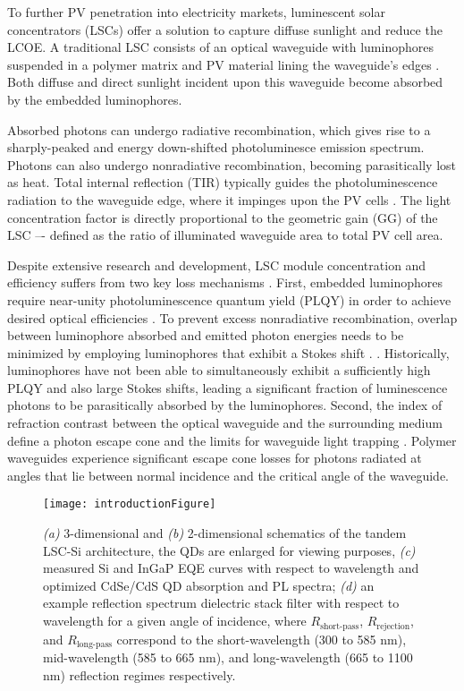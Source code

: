 \documentclass[conference]{./pvsctran}
\begin{document}
		To further PV penetration into electricity markets, luminescent solar concentrators (LSCs) offer a solution to capture diffuse sunlight and reduce the LCOE. A traditional LSC consists of an optical waveguide with luminophores suspended in a polymer matrix and PV material lining the waveguide’s edges \cite{Batchelder1982, Madrid2006, Meinardi2017}. Both diffuse and direct sunlight incident upon this waveguide become absorbed by the embedded luminophores. 
		
		Absorbed photons can undergo radiative recombination, which gives rise to a sharply-peaked and energy down-shifted photoluminesce emission spectrum.  Photons can also undergo nonradiative recombination, becoming parasitically lost as heat. Total internal reflection (TIR) typically guides the photoluminescence radiation to the waveguide edge, where it impinges upon the PV cells \cite{Goetzberger1977, Yablonovitch1980, Yablonovitch1982}. The light concentration factor is directly proportional to the geometric gain (GG) of the LSC –- defined as the ratio of illuminated waveguide area to total PV cell area. 
		
		Despite extensive research and development, LSC module concentration and efficiency suffers from two key loss mechanisms \cite{Gutmann2013, Sark2014}.  First, embedded luminophores require near-unity photoluminescence quantum yield (PLQY) in order to achieve desired optical efficiencies \cite{Martinez2016}.  To prevent excess nonradiative recombination, overlap between luminophore absorbed and emitted photon energies needs to be minimized by employing luminophores that exhibit a Stokes shift \cite{Bronstein2015, Hu2015}.  . Historically, luminophores have not been able to simultaneously exhibit a sufficiently high PLQY and also large Stokes shifts, leading a significant fraction of luminescence photons to be parasitically absorbed by the luminophores. Second, the index of refraction contrast between the optical waveguide and the surrounding medium define a photon escape cone and the limits for waveguide light trapping \cite{Goldschmidt2009}.  Polymer waveguides experience significant escape cone losses for photons radiated at angles that lie between normal incidence and the critical angle of the waveguide. 
		
		\begin{figure*}[t]
			\centering
			\texttt{[image: introductionFigure]}
			\caption{\textit{(a)} 3-dimensional and \textit{(b)} 2-dimensional schematics of the tandem LSC-Si architecture, the QDs are enlarged for viewing purposes, \textit{(c)} measured Si and InGaP EQE curves with respect to wavelength and optimized CdSe/CdS QD absorption and PL spectra; \textit{(d)} an example reflection spectrum dielectric stack filter with respect to wavelength for a given angle of incidence, where $R_\text{short-pass}$, $R_\text{rejection}$, and $R_\text{long-pass}$ correspond to the short-wavelength (300 to 585 nm), mid-wavelength (585 to 665 nm), and long-wavelength (665 to 1100 nm) reflection regimes respectively.}
			\label{Figure: Introduction Diagrams}
		\end{figure*}
		
\end{document}
